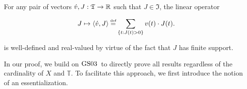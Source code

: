 \documentclass[12pt,a4paper,twoside]{article}
\newcommand{\gsii}{$\textup{GS03}$}
\newcommand{\next}{\mathrel{\mc I}}
\newcommand{\gext}{\mathrel{\grave{\mathrel{\mathcal R}}}}
\newcommand{\mbbt}{{\mathds {T}}}
\newcommand{\mbbtpp}{{\mathfrak{T}}}
\newcommand{\mbbjpp}{\mathfrak I}
\begin{document}
\begin{appendices}

For any pair of vectors $\acute v, J:
  \mbbtpp \rightarrow \R$ such that $J \in \mbbjpp$, the linear operator
\begin{linenomath*}
  \begin{equation*}
   J \mapsto \langle \acute v, J \rangle \defeq \sum_{\{t : J(t) > 0\}} v(t)
    \cdot J(t).
  \end{equation*}
\end{linenomath*}
is well-defined and real-valued by virtue of the fact that $J$ has finite
  support.

In our proof, we build on \gsii\ to directly prove all results regardless of
the cardinality of $X$ and $\mbbt$. To facilitate this approach, we first 
introduce the notion of an essentialization.


\end{appendices}
\end{document}
